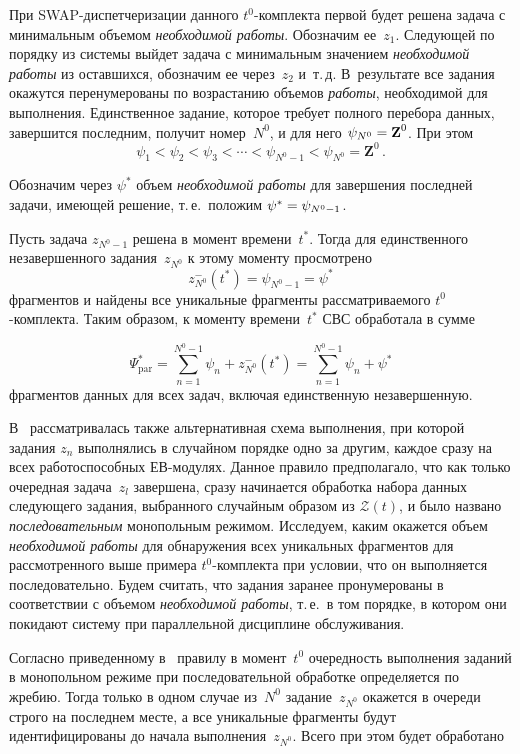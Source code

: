 \begin{multicols}{2}
При SWAP-диспет\-че\-ри\-за\-ции  данного $t^0$-ком\-плек\-та первой будет
решена задача с минимальным объемом \textit{необходимой работы}.
Обозначим ее~$z_1$. Следующей по  порядку  из системы выйдет задача
с минимальным значением \textit{необходимой работы} из оставшихся,
обозначим ее через~$z_2$ и~т.\,д. В~результате все задания окажутся
перенумерованы по возрастанию объемов \textit{работы}, необходимой
для выполнения. Единственное задание, которое требует полного
перебора данных, завершится последним, получит номер~$N^0$, и для
него $\psi_{N^0} \hm= \textbf{Z}^0$. При этом
$$
\psi_1 < \psi_2 < \psi_3 < \cdots < \psi_{N^0 - 1} < \psi_{N^0} = \textbf{Z}^0\,.  
$$

Обозначим через $\psi^*$ объем \textit{необходимой работы} для
завершения последней задачи, имеющей решение, т.\,е.\ положим $\psi^*
\hm= \psi_{N^0 - 1}$.

Пусть задача $z_{N^0 - 1}$ решена в момент времени~$t^*$. Тогда для
единственного незавершенного задания~$z_{N^0}$ к этому моменту просмотрено
$$
z^-_{N^0 }(t^*)  = \psi_{N^0 - 1} = \psi^* 
$$
фрагментов и найдены все уникальные фрагменты рассматриваемого
$t^0$-ком\-плек\-та. Таким образом, к моменту времени~$t^*$ СВС обработала в сумме

\noindent
\begin{equation}
 \Psi^*_{\mathrm{par}} = \sum\limits_{n = 1}^{N^0 - 1} \psi_n +  
 z^-_{N^0 }(t^*) = \sum\limits_{n = 1}^{N^0 - 1} \psi_n + \psi^* 
 \label{e10-mal}
 \end{equation}
фрагментов данных для всех задач, включая единственную незавершенную.

В~\cite{Prep11, Gol12} рассматривалась также альтернативная схема
выполнения, при которой  задания $z_n$ выполнялись  в  случайном
порядке одно за другим, каж\-дое сразу на всех работоспособных
ЕВ-мо\-ду\-лях. Данное правило предполагало, что как только очередная
задача~$z_l$ завершена,  сразу начинается обработка набора данных
следующего задания, выбранного случайным образом из $\mathcal{Z}(t)$, и было
названо \textit{последовательным} монопольным режимом. Исследуем,
каким окажется объем \textit{необходимой работы} для обнаружения
всех уникальных фрагментов для рассмотренного выше примера
$t^0$-ком\-плек\-та при условии, что он выполняется последовательно.
Будем считать, что задания заранее пронумерованы в соответствии с
объемом \textit{необходимой работы}, т.\,е.\ в том порядке, в котором
они покидают систему при параллельной дисциплине обслуживания.

Согласно приведенному в~\cite{Prep11, Gol12} правилу в момент~$t^0$
очередность выполнения заданий в монопольном режиме при
последовательной обработке определяется по жребию. Тогда только в
одном случае из~$N^0$ задание~$z_{N^0}$ окажется в очереди строго на
последнем месте, а все уникальные фрагменты будут идентифицированы
до начала выполнения~$z_{N^0}$. Всего при этом   будет обработано


\end{multicols}
